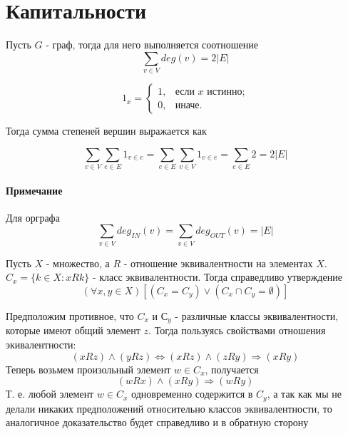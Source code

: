 \section{Капитальности}

\begin{Th}
	Пусть $ G $ - граф, тогда для него выполняется соотношение \[ \sum_{v \in V} deg (v) = 2 \left| E \right| \]
\end{Th}

\begin{Proof}
	\[
		\mathfrak{1}_x =
		\begin{cases}
			1, & \text{если $x$ истинно;} \\
			0, & \text{иначе.}
		\end{cases}
	\]

	Тогда сумма степеней вершин выражается как

	\[
		\sum_{v \in V} \sum_{e \in E} \mathfrak{1}_{v \in e} = \sum_{e \in E} \sum_{v \in V} \mathfrak{1}_{v \in e} = \sum_{e \in E} 2 = 2 \left| E \right|
	\]
\end{Proof}

\paragraph{Примечание}

Для орграфа \[ \sum_{v \in V} deg_{IN} (v) = \sum_{v \in V} deg_{OUT} (v) = \left| E \right| \]

\begin{Th}
	Пусть $ X $ - множество, а $ R $ - отношение эквивалентности на элементах $ X $. $ C_x = \{ k \in X : x R k \} $ - класс эквивалентности. Тогда справедливо утверждение \[ \left( \forall x,y \in X \right) \left[ \left( C_x = C_y \right) \lor \left( C_x \cap C_y = \emptyset \right) \right] \]
\end{Th}

\begin{Proof}
	Предположим противное, что $ C_x $ и $ С_y $ - различные классы эквивалентности, которые имеют общий элемент $ z $. Тогда пользуясь свойствами отношения экивалентности:
\[
	\left( x R z \right) \land \left( y R z \right) \Leftrightarrow \left( x R z\right) \land \left( z R y \right) \Rightarrow \left( x R y \right)
\]
	Теперь возьмем произольный элемент $ w \in C_x $, получается
\[
	\left( w R x \right) \land \left( x R y \right) \Rightarrow \left( w R y \right)
\]
	Т. е. любой элемент $ w \in C_x $ одновременно содержится в $ C_y $, а так как мы не делали никаких предположений относительно классов эквивалентности, то аналогичное доказательство будет справедливо и в обратную сторону
\end{Proof}

